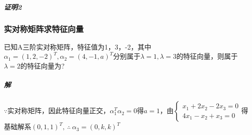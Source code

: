 \subparagraph{证明2}


\subsubsection{实对称矩阵求特征向量}
已知A三阶实对称矩阵，特征值为1，3，-2，其中\(\alpha_1 = (1, 2, -2)^T, \alpha_2 = (4, -1, a)^T\)分别属于\(\lambda = 1, \lambda = 3\)的特征向量，则属于\(\lambda = 2\)的特征向量为?
\subparagraph{解}
\(\because\)实对称矩阵，因此特征向量正交，\(\alpha_1^T\alpha_2 = 0\)得\(a = 1\)，由\(\begin{cases}
    x_1 + 2x_2 - 2x_3 = 0 \\ 
    4x_1 - x_2 + x_3 = 0
\end{cases}\)得基础解系\((0, 1, 1)^T,\ \therefore\ \alpha_3 = (0, k, k)^T\)



